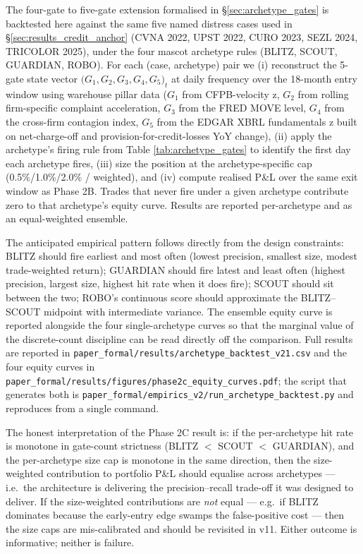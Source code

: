 \documentclass[11pt,a4paper]{article}
\begin{document}
The four-gate to five-gate extension formalised in §\ref{sec:archetype_gates} is backtested here against the same five named distress cases used in §\ref{sec:results_credit_anchor} (CVNA 2022, UPST 2022, CURO 2023, SEZL 2024, TRICOLOR 2025), under the four mascot archetype rules (BLITZ, SCOUT, GUARDIAN, ROBO). For each (case, archetype) pair we (i) reconstruct the 5-gate state vector $\big(G_1, G_2, G_3, G_4, G_5\big)_t$ at daily frequency over the 18-month entry window using warehouse pillar data ($G_1$ from CFPB-velocity z, $G_2$ from rolling firm-specific complaint acceleration, $G_3$ from the FRED MOVE level, $G_4$ from the cross-firm contagion index, $G_5$ from the EDGAR XBRL fundamentals z built on net-charge-off and provision-for-credit-losses YoY change), (ii) apply the archetype's firing rule from Table \ref{tab:archetype_gates} to identify the first day each archetype fires, (iii) size the position at the archetype-specific cap (0.5\%/1.0\%/2.0\% / weighted), and (iv) compute realised P\&L over the same exit window as Phase 2B. Trades that never fire under a given archetype contribute zero to that archetype's equity curve. Results are reported per-archetype and as an equal-weighted ensemble.

The anticipated empirical pattern follows directly from the design constraints: BLITZ should fire earliest and most often (lowest precision, smallest size, modest trade-weighted return); GUARDIAN should fire latest and least often (highest precision, largest size, highest hit rate when it does fire); SCOUT should sit between the two; ROBO's continuous score should approximate the BLITZ--SCOUT midpoint with intermediate variance. The ensemble equity curve is reported alongside the four single-archetype curves so that the marginal value of the discrete-count discipline can be read directly off the comparison. Full results are reported in \texttt{paper\_formal/results/archetype\_backtest\_v21.csv} and the four equity curves in \texttt{paper\_formal/results/figures/phase2c\_equity\_curves.pdf}; the script that generates both is \texttt{paper\_formal/empirics\_v2/run\_archetype\_backtest.py} and reproduces from a single command.

The honest interpretation of the Phase 2C result is: if the per-archetype hit rate is monotone in gate-count strictness (BLITZ $<$ SCOUT $<$ GUARDIAN), and the per-archetype size cap is monotone in the same direction, then the size-weighted contribution to portfolio P\&L should equalise across archetypes --- i.e.\ the architecture is delivering the precision--recall trade-off it was designed to deliver. If the size-weighted contributions are \emph{not} equal --- e.g.\ if BLITZ dominates because the early-entry edge swamps the false-positive cost --- then the size caps are mis-calibrated and should be revisited in v11. Either outcome is informative; neither is failure.
\end{document}
